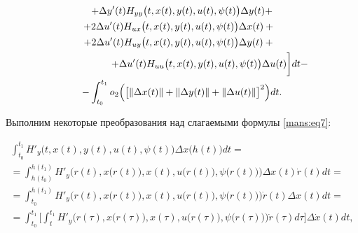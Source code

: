 \begin{multline}
\\

+\Delta y'(t) H_{yy} \bigl(t, x(t), y(t), u(t), \psi (t)\bigr) \Delta y(t)+ \\

+2 

\Delta u'(t) H_{ux} \bigl(t, x(t), y(t), u(t), \psi (t)\bigr) \Delta x(t)+ \phantom{2} \\

 + 2 \Delta u'(t) H_{uy}\bigl(t, x(t), y(t), u(t), \psi (t)\bigr) \Delta y(t)+ \phantom{2}

\\

\hspace{2cm}

+  \Delta u'(t) H_{uu} \bigl(t, x(t), y(t), u(t), \psi (t)\bigr) \Delta u(t)  \biggr] dt - \\

-\int_{t_{0}}^{t_{1}} o_{2} \Bigl( \bigl[\Vert \Delta x(t) \Vert +\Vert \Delta y(t) \Vert+\Vert \Delta u(t) \Vert \bigr]^{2} \Bigr) dt .

\label{mans:eq7}

\end{multline}









Выполним некоторые преобразования над слагаемыми формулы \eqref{mans:eq7}:

\begin{multline}

 \int_{t_{0}}^{t_{1}} H'_{y} \bigl(t, x(t), y(t), u(t), \psi (t)\bigr) \Delta x\bigl(h(t)\bigr) dt = 

 \\

 =

 \int_{h(t_{0})}^{h(t_{1})} 

 H'_{y} \bigl(r(t), x\bigl(r(t)\bigr), x(t), u\bigl(r(t)\bigr), \psi \bigl(r(t)\bigr)\bigr) \Delta x(t) \dot{r}(t) dt= \\

 = \int_{t_{0}}^{h(t_{1})} 

 H'_{y} \bigl(r(t), x\bigl(r(t)\bigr), x(t), u\bigl(r(t)\bigr), \psi \bigl(r(t)\bigr)\bigr) \dot{r}(t) \Delta x(t) dt = \\

 =\int_{t_{0}}^{t_{1}} 

 \biggl[ 

 \int_{t}^{t_{1}} H'_{y} \bigl(r(\tau), x \bigl(r(\tau)\bigr), x(\tau), u\bigl(r(\tau)\bigr), \psi \bigl(r(\tau)\bigr)\bigr) \dot{r}(\tau) d\tau \biggr] \Delta \dot{x}(t) dt , 

 \label{mans:eq8}

\end{multline}

